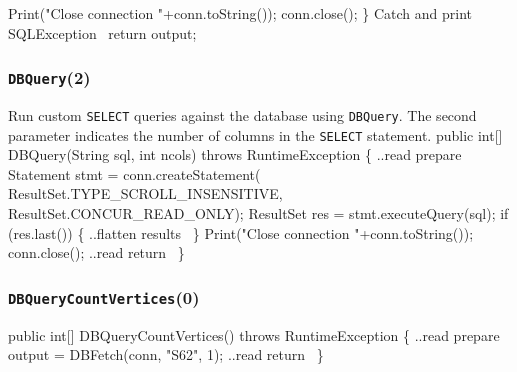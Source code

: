\documentclass{article}
\def\nwendcode{\endtrivlist \endgroup}      %
\let\nwdocspar=\par
\theoremstyle{definition}                   %
\begin{document}
  Print("Close connection "+conn.toString());
  conn.close();
\}
\LA{}Catch and print \code{}SQLException\edoc{}~{\nwtagstyle{}}\RA{}
return output;
\nwendcode{}\nwdocspar

\subsubsection{{\tt{}DBQuery}(2)}
Run custom {\tt{}SELECT} queries against the database using {\tt{}DBQuery}. The
second parameter indicates the number of columns in the {\tt{}SELECT} statement.
\nwenddocs{}\endmoddef{}
public int[] DBQuery(String sql, int ncols) throws RuntimeException \{
  \LA{}..read prepare~{\nwtagstyle{}}\RA{}
  Statement stmt = conn.createStatement(
    ResultSet.TYPE_SCROLL_INSENSITIVE, ResultSet.CONCUR_READ_ONLY);
  ResultSet res = stmt.executeQuery(sql);
  if (res.last()) \{
    \LA{}..flatten results~{\nwtagstyle{}}\RA{}
  \}
  Print("Close connection "+conn.toString());
  conn.close();
  \LA{}..read return~{\nwtagstyle{}}\RA{}
\}
\nwendcode{}%

\subsubsection{{\tt{}\protect{}\protect{}DBQueryCountVertices}(0)}
\nwenddocs{}\endmoddef{}
public int[] DBQueryCountVertices() throws RuntimeException \{
  \LA{}..read prepare~{\nwtagstyle{}}\RA{}
  output = DBFetch(conn, "S62", 1);
  \LA{}..read return~{\nwtagstyle{}}\RA{}
\}
\eatline
{}\nwendcode{}\nwdocspar
\end{document}
